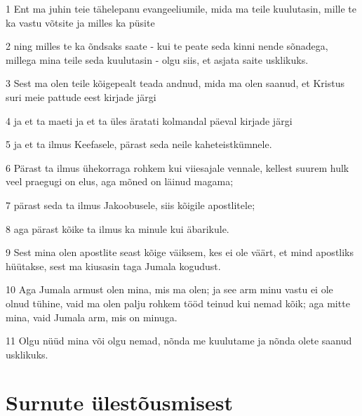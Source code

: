 \par 1 Ent ma juhin teie tähelepanu evangeeliumile, mida ma teile kuulutasin, mille te ka vastu võtsite ja milles ka püsite
\par 2 ning milles te ka õndsaks saate - kui te peate seda kinni nende sõnadega, millega mina teile seda kuulutasin - olgu siis, et asjata saite usklikuks.
\par 3 Sest ma olen teile kõigepealt teada andnud, mida ma olen saanud, et Kristus suri meie pattude eest kirjade järgi
\par 4 ja et ta maeti ja et ta üles äratati kolmandal päeval kirjade järgi
\par 5 ja et ta ilmus Keefasele, pärast seda neile kaheteistkümnele.
\par 6 Pärast ta ilmus ühekorraga rohkem kui viiesajale vennale, kellest suurem hulk veel praegugi on elus, aga mõned on läinud magama;
\par 7 pärast seda ta ilmus Jakoobusele, siis kõigile apostlitele;
\par 8 aga pärast kõike ta ilmus ka minule kui äbarikule.
\par 9 Sest mina olen apostlite seast kõige väiksem, kes ei ole väärt, et mind apostliks hüütakse, sest ma kiusasin taga Jumala kogudust.
\par 10 Aga Jumala armust olen mina, mis ma olen; ja see arm minu vastu ei ole olnud tühine, vaid ma olen palju rohkem tööd teinud kui nemad kõik; aga mitte mina, vaid Jumala arm, mis on minuga.
\par 11 Olgu nüüd mina või olgu nemad, nõnda me kuulutame ja nõnda olete saanud usklikuks.

\section*{Surnute ülestõusmisest}

